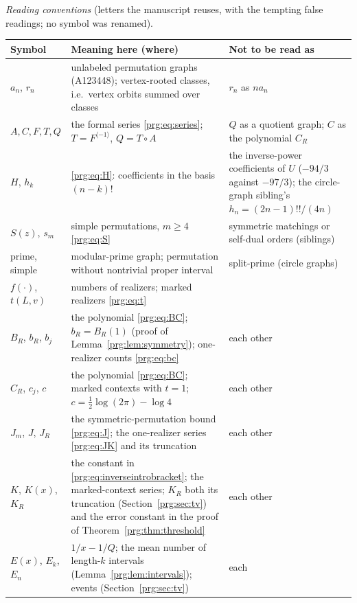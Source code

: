\documentclass[11pt,letterpaper]{article}
\numberwithin{equation}{section}
\theoremstyle{definition}\newtheorem{definition}[theorem]{Definition}
\theoremstyle{remark}\newtheorem{remark}[theorem]{Remark}
\begin{document}
\medskip\noindent\begin{minipage}{\textwidth}
\emph{Reading conventions} (letters the manuscript reuses, with the tempting
false readings; no symbol was renamed).

\smallskip
\begingroup\small\renewcommand{\arraystretch}{1.1}
\noindent\begin{tabular}{@{}>{\raggedright\arraybackslash}p{0.95in}>{\raggedright\arraybackslash}p{3.25in}>{\raggedright\arraybackslash}p{1.95in}@{}}
\toprule
Symbol & Meaning here (where) & Not to be read as\\
\midrule
$a_n$, $r_n$ & unlabeled permutation graphs (A123448); vertex-rooted classes,
 i.e.\ vertex orbits summed over classes & $r_n$ as $na_n$\\
$A,C,F,T,Q$ & the formal series \eqref{prg:eq:series}; $T=F^{\langle-1\rangle}$,
 $Q=T\circ A$ & $Q$ as a quotient graph; $C$ as the polynomial $C_R$\\
$H$, $h_k$ & \eqref{prg:eq:H}: coefficients in the basis $(n-k)!$ &
 the inverse-power coefficients of $U$ ($-94/3$ against $-97/3$); the
 circle-graph sibling's $h_n=(2n-1)!!/(4n)$\\
$S(z)$, $s_m$ & simple permutations, $m\ge4$ \eqref{prg:eq:S} & symmetric
 matchings or self-dual orders (siblings)\\
prime, simple & modular-prime graph; permutation without nontrivial proper
 interval & split-prime (circle graphs)\\
$f(\cdot)$, $t(L,v)$ & numbers of realizers; marked realizers \eqref{prg:eq:t}
 & \\
$B_R$, $b_R$, $b_j$ & the polynomial \eqref{prg:eq:BC}; $b_R=B_R(1)$ (proof of
 Lemma~\ref{prg:lem:symmetry}); one-realizer counts \eqref{prg:eq:bc} & each
 other\\
$C_R$, $c_j$, $c$ & the polynomial \eqref{prg:eq:BC}; marked contexts with
 $t=1$; $c=\tfrac12\log(2\pi)-\log4$ & each other\\
$J_m$, $J$, $J_R$ & the symmetric-permutation bound \eqref{prg:eq:J}; the
 one-realizer series \eqref{prg:eq:JK} and its truncation & each other\\
$K$, $K(x)$, $K_R$ & the constant in \eqref{prg:eq:inverseintrobracket}; the
 marked-context series; $K_R$ both its truncation (Section~\ref{prg:sec:tv})
 and the error constant in the proof of Theorem~\ref{prg:thm:threshold} &
 each other\\
$E(x)$, $E_k$, $E_n$ & $1/x-1/Q$; the mean number of length-$k$ intervals
 (Lemma~\ref{prg:lem:intervals}); events (Section~\ref{prg:sec:tv}) & each

\end{tabular}
\end{minipage}
\end{document}

